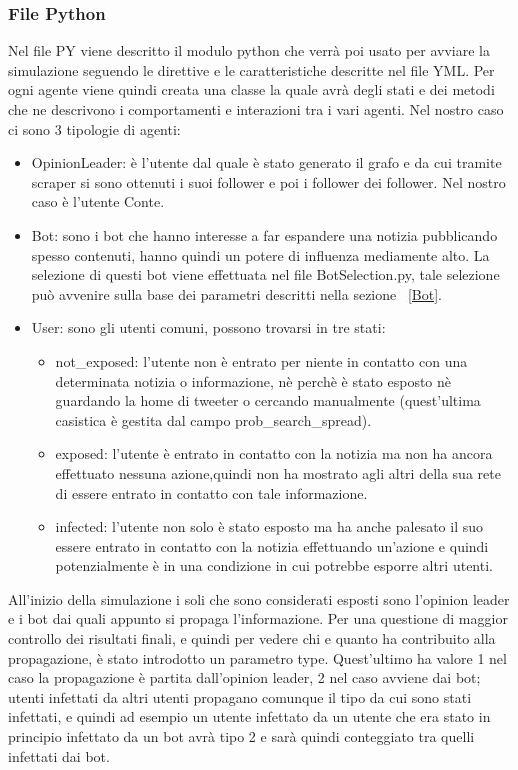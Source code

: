         \subsubsection{File Python}
        Nel file PY viene descritto il modulo python che verrà poi usato per avviare la simulazione seguendo le direttive e le caratteristiche descritte nel file YML. Per ogni agente viene quindi creata una classe la quale avrà degli stati e dei metodi che ne descrivono i comportamenti e interazioni tra i vari agenti. Nel nostro caso ci sono 3 tipologie di agenti:
        \begin{itemize}
        \item OpinionLeader: è l’utente dal quale è stato generato il grafo e da cui tramite scraper si sono ottenuti i suoi follower e poi i follower dei follower. Nel nostro caso è l’utente Conte.
        \item Bot: sono i bot che hanno interesse a far espandere una notizia pubblicando spesso contenuti, hanno quindi un potere di influenza mediamente alto. La selezione di questi bot viene effettuata nel file BotSelection.py, tale selezione può avvenire sulla base dei parametri descritti nella sezione ~\ref{Bot}.
        \item User: sono gli utenti comuni, possono trovarsi in tre stati:
          \begin{itemize}
          \item not\_exposed: l’utente non è entrato per niente in contatto con una determinata notizia o informazione, nè perchè è stato esposto nè guardando la home di tweeter o cercando manualmente (quest’ultima casistica è gestita dal campo prob\_search\_spread).
          \item exposed: l’utente è entrato in contatto con la notizia ma non ha ancora effettuato nessuna azione,quindi non ha mostrato agli altri della sua rete di essere entrato in contatto con tale informazione.
          \item infected: l’utente non solo è stato esposto ma ha anche palesato il suo essere entrato in contatto con la notizia effettuando un'azione e quindi potenzialmente è in una condizione in cui potrebbe esporre altri utenti.
          \end{itemize}
        \end{itemize}
        All’inizio della simulazione i soli che sono considerati esposti sono l’opinion leader e i bot dai quali appunto si propaga l’informazione. Per una questione di maggior controllo dei risultati finali, e quindi per vedere chi e quanto ha contribuito alla propagazione, è stato introdotto un parametro type. Quest’ultimo ha valore 1 nel caso la propagazione è partita dall’opinion leader, 2 nel caso avviene dai bot; utenti infettati da altri utenti propagano comunque il tipo da cui sono stati infettati, e quindi ad esempio un utente infettato da un utente che era stato in principio infettato da un bot avrà tipo 2 e sarà quindi conteggiato tra quelli infettati dai bot.
